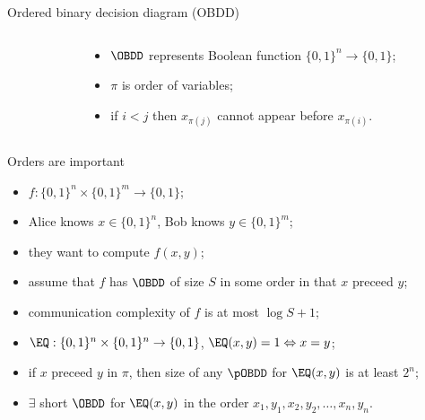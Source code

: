 \begin{frame}{Ordered binary decision diagram (OBDD)}
    \begin{columns}[t]
        \begin{column}{0.3\textwidth}
            
        \end{column}
        
		\begin{column}{0.6\textwidth}
            \begin{itemize}
                \item $\OBDD$ represents Boolean function $\{0, 1\}^n \to \{0, 1\}$;
                \item $\pi$ is order of variables;
                \item if $i < j$ then $x_{\pi(j)}$ cannot appear before $x_{\pi(i)}$.
            \end{itemize}
		\end{column}
	\end{columns}    
\end{frame}

\begin{frame}{Orders are important}
    \begin{itemize}
        \item $f: \{0, 1\}^n \times \{0, 1\}^m \to \{0, 1\}$;
        \item Alice knows $x \in \{0, 1\}^n$, Bob knows $y \in \{0, 1\}^m$;
        \item they want to compute $f(x, y)$;
        \pause
        \item assume that $f$ has $\OBDD$ of size $S$ in some order in that $x$ preceed $y$;
        \item communication complexity of $f$ is at most $\log S + 1$;
        \pause
        \item $\EQ: \{0, 1\}^n \times \{0, 1\}^n \to \{0, 1\}$, $\EQ(x, y) = 1 \Leftrightarrow x = y$;
        \item if $x$ preceed $y$ in $\pi$, then size of any $\pOBDD$ for $\EQ(x, y)$ is at least $2^n$;
        \pause
        \item $\exists$ short $\OBDD$ for $\EQ(x, y)$ in the order $x_1, y_1, x_2, y_2, \dots, x_n, y_n$.
    \end{itemize}
\end{frame}


